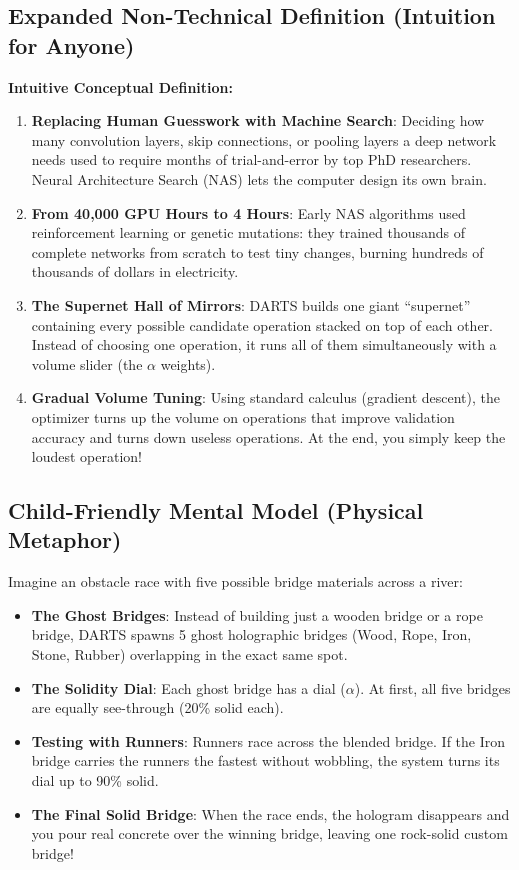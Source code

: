 \documentclass[11pt,a4paper]{article}
\theoremstyle{definition}
\begin{document}
\subsection{Expanded Non-Technical Definition (Intuition for Anyone)}
\textbf{Intuitive Conceptual Definition:}
\begin{enumerate}
    \item \textbf{Replacing Human Guesswork with Machine Search}: Deciding how many convolution layers, skip connections, or pooling layers a deep network needs used to require months of trial-and-error by top PhD researchers. Neural Architecture Search (NAS) lets the computer design its own brain.
    \item \textbf{From 40,000 GPU Hours to 4 Hours}: Early NAS algorithms used reinforcement learning or genetic mutations: they trained thousands of complete networks from scratch to test tiny changes, burning hundreds of thousands of dollars in electricity.
    \item \textbf{The Supernet Hall of Mirrors}: DARTS builds one giant ``supernet'' containing every possible candidate operation stacked on top of each other. Instead of choosing one operation, it runs all of them simultaneously with a volume slider (the $\alpha$ weights).
    \item \textbf{Gradual Volume Tuning}: Using standard calculus (gradient descent), the optimizer turns up the volume on operations that improve validation accuracy and turns down useless operations. At the end, you simply keep the loudest operation!
\end{enumerate}

\subsection{Child-Friendly Mental Model (Physical Metaphor)}
Imagine an obstacle race with five possible bridge materials across a river:
\begin{itemize}
    \item \textbf{The Ghost Bridges}: Instead of building just a wooden bridge or a rope bridge, DARTS spawns 5 ghost holographic bridges (Wood, Rope, Iron, Stone, Rubber) overlapping in the exact same spot.
    \item \textbf{The Solidity Dial}: Each ghost bridge has a dial ($\alpha$). At first, all five bridges are equally see-through (20\% solid each).
    \item \textbf{Testing with Runners}: Runners race across the blended bridge. If the Iron bridge carries the runners the fastest without wobbling, the system turns its dial up to 90\% solid.
    \item \textbf{The Final Solid Bridge}: When the race ends, the hologram disappears and you pour real concrete over the winning bridge, leaving one rock-solid custom bridge!
\end{itemize}
\end{document}
